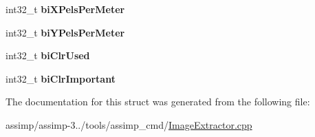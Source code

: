 \begin{DoxyCompactItemize}
\item 
\hypertarget{struct_b_i_t_m_a_p_i_n_f_o_h_e_a_d_e_r_a2ac832baa60dbaf2e5a3e185d8c89592}{int32\+\_\+t {\bfseries bi\+X\+Pels\+Per\+Meter}}\label{struct_b_i_t_m_a_p_i_n_f_o_h_e_a_d_e_r_a2ac832baa60dbaf2e5a3e185d8c89592}

\item 
\hypertarget{struct_b_i_t_m_a_p_i_n_f_o_h_e_a_d_e_r_a56251e2c9b3933ac108978baadf556c8}{int32\+\_\+t {\bfseries bi\+Y\+Pels\+Per\+Meter}}\label{struct_b_i_t_m_a_p_i_n_f_o_h_e_a_d_e_r_a56251e2c9b3933ac108978baadf556c8}

\item 
\hypertarget{struct_b_i_t_m_a_p_i_n_f_o_h_e_a_d_e_r_af9e22319cbab9fb1ba27ad633f5e9365}{int32\+\_\+t {\bfseries bi\+Clr\+Used}}\label{struct_b_i_t_m_a_p_i_n_f_o_h_e_a_d_e_r_af9e22319cbab9fb1ba27ad633f5e9365}

\item 
\hypertarget{struct_b_i_t_m_a_p_i_n_f_o_h_e_a_d_e_r_aa0c6a20af95de266f11abd84176abdac}{int32\+\_\+t {\bfseries bi\+Clr\+Important}}\label{struct_b_i_t_m_a_p_i_n_f_o_h_e_a_d_e_r_aa0c6a20af95de266f11abd84176abdac}

\end{DoxyCompactItemize}


The documentation for this struct was generated from the following file\+:\begin{DoxyCompactItemize}
\item 
assimp/assimp-\/3../tools/assimp\+\_\+cmd/\hyperlink{_image_extractor_8cpp}{Image\+Extractor.\+cpp}\end{DoxyCompactItemize}
